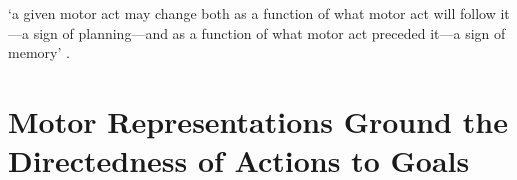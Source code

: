 \documentclass[12pt]{extarticle}
\begin{document}
\begin{multicols*}{3}
‘a given motor act may change both as a function of what motor act will follow it—a sign of
planning—and as a function of what motor act preceded it—a sign
of memory’ \citep[p.~294]{cohen:2004_wherea}.
 
 
 
\section{Motor Representations Ground the Directedness of Actions to Goals}
 

    


\footnotesize


\end{multicols*}
\end{document}

